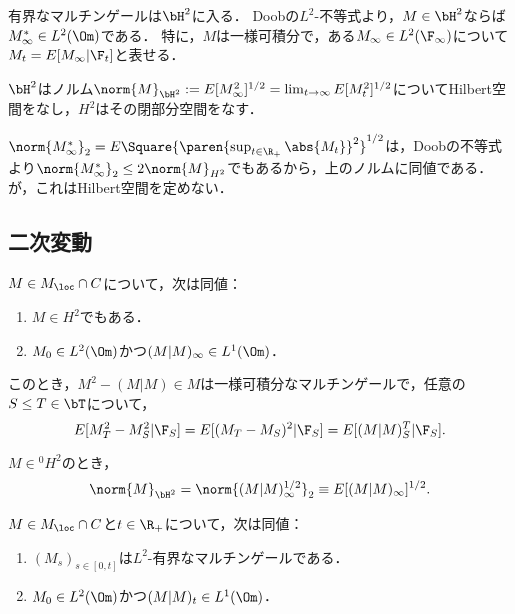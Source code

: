 \documentclass[uplatex,dvipdfmx]{jsreport}
\begin{document}
\begin{observation}
    有界なマルチンゲールは$\bH^2$に入る．
    Doobの$L^2$-不等式より，$M\in\bH^2$ならば$M^*_\infty\in L^2(\Om)$である．
    特に，$M$は一様可積分で，ある$M_\infty\in L^2(\F_\infty)$について$M_t=E[M_\infty|\F_t]$と表せる．
\end{observation}

\begin{theorem}
    $\bH^2$はノルム$\norm{M}_{\bH^2}:=E[M^2_\infty]^{1/2}=\lim_{t\to\infty}E[M_t^2]^{1/2}$についてHilbert空間をなし，$H^2$はその閉部分空間をなす．
\end{theorem}

\begin{remark}
    $\norm{M^*_\infty}_2=E\Square{\paren{\sup_{t\in\R_+}\abs{M_t}}^{2}}^{1/2}$は，Doobの不等式より$\norm{M^*_\infty}_2\le2\norm{M}_{H^2}$でもあるから，上のノルムに同値である．
    が，これはHilbert空間を定めない．
\end{remark}

\subsection{二次変動}

\begin{proposition}
    $M\in M_\loc\cap C$について，次は同値：
    \begin{enumerate}
        \item $M\in H^2$でもある．
        \item $M_0\in L^2(\Om)$かつ$(M|M)_\infty\in L^1(\Om)$．
    \end{enumerate}
    このとき，$M^2-(M|M)\in M$は一様可積分なマルチンゲールで，任意の$S\le T\in\bT$について，
    \[E[M^2_T-M^2_S|\F_S]=E[(M_T-M_S)^2|\F_S]=E[(M|M)^T_S|\F_S].\]
\end{proposition}

\begin{corollary}
    $M\in {}^0\!H^2$のとき，
    \[\norm{M}_{\bH^2}=\norm{(M|M)^{1/2}_\infty}_2\equiv E[(M|M)_\infty]^{1/2}.\]
\end{corollary}

\begin{proposition}
    $M\in M_\loc\cap C$と$t\in\R_+$について，次は同値：
    \begin{enumerate}
        \item $(M_s)_{s\in[0,t]}$は$L^2$-有界なマルチンゲールである．
        \item $M_0\in L^2(\Om)$かつ$(M|M)_t\in L^1(\Om)$．
    \end{enumerate}
\end{proposition}
\end{document}

